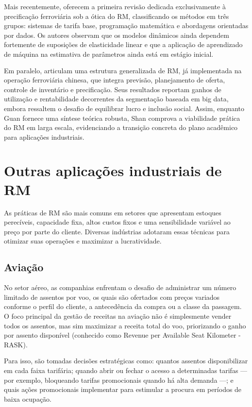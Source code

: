 Mais recentemente, \cite{Guan2023} oferecem a primeira revisão dedicada exclusivamente à precificação ferroviária sob a ótica do RM, classificando os métodos em três grupos: sistemas de tarifa base, programação matemática e abordagens orientadas por dados. Os autores observam que os modelos dinâmicos ainda dependem fortemente de suposições de elasticidade linear e que a aplicação de aprendizado de máquina na estimativa de parâmetros ainda está em estágio inicial.

Em paralelo, \citep{Shan2024} articulam uma estrutura generalizada de RM, já implementada na operação ferroviária chinesa, que integra previsão, planejamento de oferta, controle de inventário e precificação. Seus resultados reportam ganhos de utilização e rentabilidade decorrentes da segmentação baseada em big data, embora ressaltem o desafio de equilibrar lucro e inclusão social. Assim, enquanto Guan fornece uma síntese teórica robusta, Shan comprova a viabilidade prática do RM em larga escala, evidenciando a transição concreta do plano acadêmico para aplicações industriais.

\section{Outras aplicações industriais de RM}
As práticas de RM são mais comuns em setores que apresentam estoques perecíveis, capacidade fixa, altos custos fixos e uma sensibilidade variável ao preço por parte do cliente. Diversas indústrias adotaram essas técnicas para otimizar suas operações e maximizar a lucratividade.

\subsection{Aviação}
No setor aéreo, as companhias enfrentam o desafio de administrar um número limitado de assentos por voo, os quais são ofertados com preços variados conforme o perfil do cliente, a antecedência da compra ou a classe da passagem. O foco principal da gestão de receitas na aviação não é simplesmente vender todos os assentos, mas sim maximizar a receita total do voo, priorizando o ganho por assento disponível (conhecido como Revenue per Available Seat Kilometer - RASK).

Para isso, são tomadas decisões estratégicas como: quantos assentos disponibilizar em cada faixa tarifária; quando abrir ou fechar o acesso a determinadas tarifas — por exemplo, bloqueando tarifas promocionais quando há alta demanda —; e quais ações promocionais implementar para estimular a procura em períodos de baixa ocupação.

